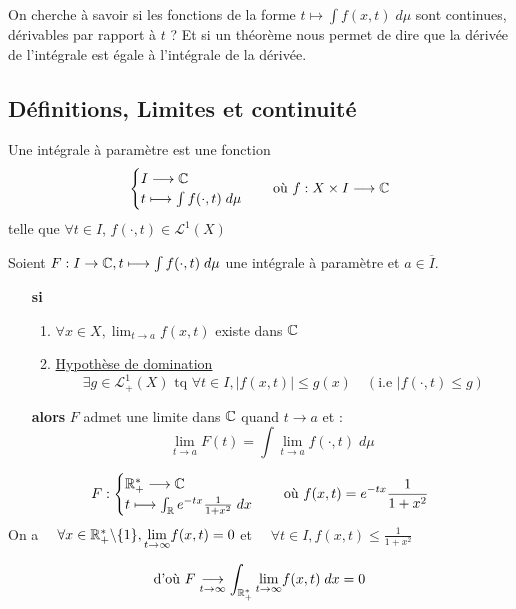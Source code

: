 On cherche à savoir si les fonctions de la forme $t \longmapsto \int f(x,t) \; d \mu$ sont continues, dérivables par rapport à $t$ ?
Et si un théorème nous permet de dire que la dérivée de l'intégrale est égale à l'intégrale de la dérivée. 

\subsection{Définitions, Limites et continuité}

\begin{definition}
    Une intégrale à paramètre est une fonction 
    \[ 
        \begin{cases}
            I \longrightarrow \mathbb{C} \\
            t \longmapsto \int f(\cdot, t) \; d \mu 
        \end{cases}
    \quad \text{où } f : X \times I \longrightarrow \mathbb{C} \]
    telle que $\forall t \in I $, $f(\cdot, t) \in \mathcal{L}^1(X) $
\end{definition}

\begin{theorem}
    Soient $F : I \rightarrow \mathbb{C}, t \longmapsto \int f(\cdot, t) \; d \mu $ une intégrale à paramètre et $a \in \overline{I}$.
    \begin{itemize}
        \item[\textbf{si}] \begin{enumerate}
                        \item $\forall x \in X, \lim_{t \to a} f(x,t)$ existe dans $\mathbb{C}$
                        \item \underline{Hypothèse de domination}
                            \[ \exists g \in \mathcal{L}_+^1(X) \text{ tq } \forall t \in I, |f(x,t)| \leq g(x) \quad (\text{i.e } |f(\cdot, t) \leq g) \]
                     \end{enumerate}
        \item[\textbf{alors}] $F$ admet une limite dans $\mathbb{C}$ quand $t \to a$ et :
                \[ \boxed{ \lim_{t\to a} F(t) = \int \lim_{t\to a} f(\cdot, t) \; d \mu } \] 
    \end{itemize}
\end{theorem}

\begin{example}
    \[ F :
        \begin{cases}
            \mathbb{R}_+^* \longrightarrow \mathbb{C} \\
            t \longmapsto \int_{\mathbb{R}} e^{-tx} \frac{1}{1 + x^2} \; d x 
        \end{cases} 
        \quad \text{où } f(x,t) = e^{-tx} \frac{1}{1 + x^2} 
    \] 
    On a $\quad \forall x \in \mathbb{R}_+^* \backslash \{1\}, \underset{t \to \infty}{\lim} f(x,t) = 0 $ et $ \quad \forall t \in I, f(x,t) \leq \frac{1}{1 + x^2}$ 

    \[ \text{d'où } F \underset{t \to \infty}{\longrightarrow} \int_{\mathbb{R}_+^*} \underset{t \to \infty}{\lim} f(x,t) \; d x = 0 \]
\end{example}

